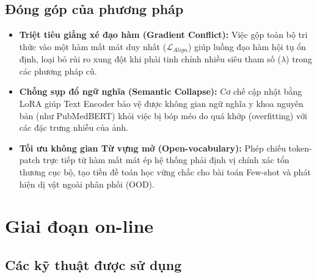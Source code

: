 \subsection{Đóng góp của phương pháp}
\begin{itemize}
    \item \textbf{Triệt tiêu giằng xé đạo hàm (Gradient Conflict):} Việc gộp toàn bộ tri thức vào một hàm mất mát duy nhất ($\mathcal{L}_{Align}$) giúp luồng đạo hàm hội tụ ổn định, loại bỏ rủi ro xung đột khi phải tinh chỉnh nhiều siêu tham số ($\lambda$) trong các phương pháp cũ.
    \item \textbf{Chống sụp đổ ngữ nghĩa (Semantic Collapse):} Cơ chế cập nhật bằng LoRA giúp Text Encoder bảo vệ được không gian ngữ nghĩa y khoa nguyên bản (như PubMedBERT) khỏi việc bị bóp méo do quá khớp (overfitting) với các đặc trưng nhiễu của ảnh.
    \item \textbf{Tối ưu không gian Từ vựng mở (Open-vocabulary):} Phép chiếu token-patch trực tiếp từ hàm mất mát ép hệ thống phải định vị chính xác tổn thương cục bộ, tạo tiền đề toán học vững chắc cho bài toán Few-shot và phát hiện dị vật ngoài phân phối (OOD).
\end{itemize}

\section{Giai đoạn on-line}
\subsection{Các kỹ thuật được sử dụng}